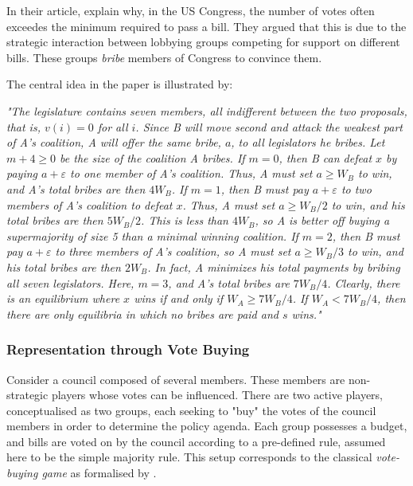 \vspace*{1em}
In their article, \textcite{grosecloseBuyingSupermajorities1996} explain why, in the US Congress, the number of votes often exceedes the minimum required to pass a bill. They argued that this is due to the strategic interaction between lobbying groups competing for support on different bills. These groups \textit{bribe} members of Congress to convince them. 

\vspace*{1em}
The central idea in the paper is illustrated by:

\vspace{1em}
\textit{"The legislature contains seven members, all indifferent between the two proposals, that is, $v(i) = 0$ for all $i$. Since B will move second and attack the weakest part of A's coalition, A will offer the same bribe, $a$, to all legislators he bribes. Let $m + 4 \ge 0$ be the size of the coalition A bribes. If $m = 0$, then B can defeat $x$ by paying $a + \varepsilon$ to one member of A's coalition. Thus, A must set $a \ge W_B$ to win, and A's total bribes are then $4W_B$. If $m = 1$, then B must pay $a + \varepsilon$ to two members of A's coalition to defeat $x$. Thus, A must set $a \ge W_B/2$ to win, and his total bribes are then $5W_B/2$. This is less than $4W_B$, so A is better off buying a supermajority of size 5 than a minimal winning coalition. If $m = 2$, then B must pay $a + \varepsilon$ to three members of A's coalition, so A must set $a \ge W_B/3$ to win, and his total bribes are then $2W_B$. In fact, A minimizes his total payments by bribing all seven legislators. Here, $m = 3$, and A's total bribes are $7W_B/4$. Clearly, there is an equilibrium where $x$ wins if and only if $W_A \ge 7W_B/4$. If $W_A < 7W_B/4$, then there are only equilibria in which no bribes are paid and $s$ wins."} \parencite{grosecloseBuyingSupermajorities1996}


\subsubsection{Representation through Vote Buying}
Consider a council composed of several members. These members are non-strategic players whose votes can be influenced. There are two active players, conceptualised as two groups, each seeking to "buy" the votes of the council members in order to determine the policy agenda. Each group possesses a budget, and bills are voted on by the council according to a pre-defined rule, assumed here to be the simple majority rule. This setup corresponds to the classical \textit{vote-buying game} as formalised by \parencite{grosecloseBuyingSupermajorities1996}.

